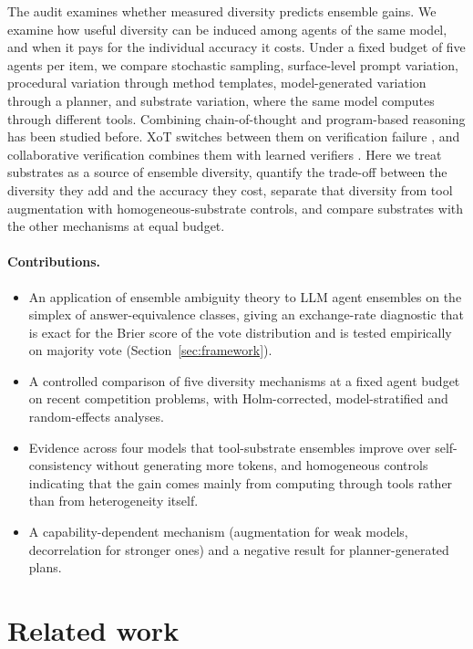 \documentclass[11pt]{article}
\begin{document}
The audit examines whether measured diversity predicts ensemble gains. We examine how useful
diversity can be induced among agents of the same model, and when it pays for the individual
accuracy it costs. Under a fixed budget of five agents per item, we compare stochastic sampling,
surface-level prompt variation, procedural variation through method templates, model-generated
variation through a planner, and substrate variation, where the same model computes through
different tools. Combining chain-of-thought and program-based reasoning has been studied before.
XoT switches between them on verification failure \citep{liu2023plan}, and collaborative
verification combines them with learned verifiers \citep{liang2024improving}. Here we treat
substrates as a source of ensemble diversity, quantify the trade-off between the diversity they
add and the accuracy they cost, separate that diversity from tool augmentation with
homogeneous-substrate controls, and compare substrates with the other mechanisms at equal budget.

\paragraph{Contributions.}
\begin{itemize}
\item An application of ensemble ambiguity theory to LLM agent ensembles on the simplex of
  answer-equivalence classes, giving an exchange-rate diagnostic that is exact for the Brier
  score of the vote distribution and is tested empirically on majority vote
  (Section~\ref{sec:framework}).
\item A controlled comparison of five diversity mechanisms at a fixed agent budget on recent
  competition problems, with Holm-corrected, model-stratified and random-effects analyses.
\item Evidence across four models that tool-substrate ensembles improve over self-consistency
  without generating more tokens, and homogeneous controls indicating that the gain comes mainly
  from computing through tools rather than from heterogeneity itself.
\item A capability-dependent mechanism (augmentation for weak models, decorrelation for stronger
  ones) and a negative result for planner-generated plans.
\end{itemize}

\section{Related work}
\end{document}
